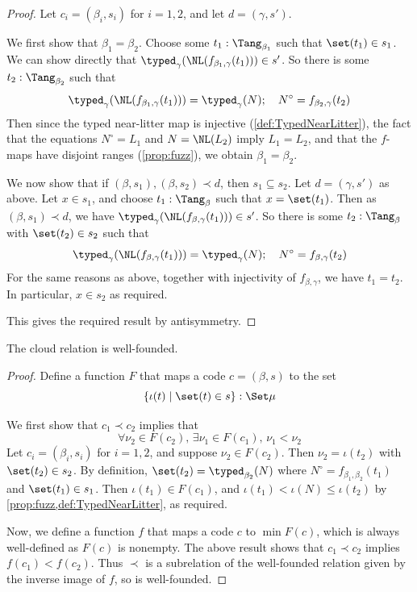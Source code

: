 \begin{proof}
  Let \( c_i = (\beta_i, s_i) \) for \( i = 1, 2 \), and let \( d = (\gamma, s') \).

  We first show that \( \beta_1 = \beta_2 \).
  Choose some \( t_1 : \Tang_{\beta_1} \) such that \( \set(t_1) \in s_1 \).
  We can show directly that \( \typed_\gamma(\NL(f_{\beta_1,\gamma}(t_1))) \in s' \).
  So there is some \( t_2 : \Tang_{\beta_2} \) such that
  \[ \typed_\gamma(\NL(f_{\beta_1,\gamma}(t_1))) = \typed_\gamma(N);\quad N^\circ = f_{\beta_2,\gamma}(t_2) \]
  Then since the typed near-litter map is injective (\cref{def:TypedNearLitter}), the fact that the equations \( N^\circ = L_1 \) and \( N = \NL(L_2) \) imply \( L_1 = L_2 \), and that the \( f \)-maps have disjoint ranges (\cref{prop:fuzz}), we obtain \( \beta_1 = \beta_2 \).

  We now show that if \( (\beta, s_1), (\beta, s_2) \prec d \), then \( s_1 \subseteq s_2 \).
  Let \( d = (\gamma, s') \) as above.
  Let \( x \in s_1 \), and choose \( t_1 : \Tang_\beta \) such that \( x = \set(t_1) \).
  Then as \( (\beta, s_1) \prec d \), we have \( \typed_\gamma(\NL(f_{\beta,\gamma}(t_1))) \in s' \).
  So there is some \( t_2 : \Tang_\beta \) with \( \set(t_2) \in s_2 \) such that
  \[ \typed_\gamma(\NL(f_{\beta,\gamma}(t_1))) = \typed_\gamma(N);\quad N^\circ = f_{\beta,\gamma}(t_2) \]
  For the same reasons as above, together with injectivity of \( f_{\beta,\gamma} \), we have \( t_1 = t_2 \).
  In particular, \( x \in s_2 \) as required.

  This gives the required result by antisymmetry.
\end{proof}
\begin{proposition}
  \label{prop:cloud_wf}
  The cloud relation is well-founded.
\end{proposition}
\begin{proof}
  Define a function \( F \) that maps a code \( c = (\beta, s) \) to the set
  \[ \{ \iota(t) \mid \set(t) \in s \} : \Set \mu \]

  We first show that \( c_1 \prec c_2 \) implies that
  \[ \forall \nu_2 \in F(c_2),\, \exists \nu_1 \in F(c_1),\, \nu_1 < \nu_2 \]
  Let \( c_i = (\beta_i, s_i) \) for \( i = 1, 2 \), and suppose \( \nu_2 \in F(c_2) \).
  Then \( \nu_2 = \iota(t_2) \) with \( \set(t_2) \in s_2 \).
  By definition, \( \set(t_2) = \typed_{\beta_2}(N) \) where \( N^\circ = f_{\beta_1,\beta_2}(t_1) \) and \( \set(t_1) \in s_1 \).
  Then \( \iota(t_1) \in F(c_1) \), and \( \iota(t_1) < \iota(N) \leq \iota(t_2) \) by \cref{prop:fuzz,def:TypedNearLitter}, as required.

  Now, we define a function \( f \) that maps a code \( c \) to \( \min F(c) \), which is always well-defined as \( F(c) \) is nonempty.
  The above result shows that \( c_1 \prec c_2 \) implies \( f(c_1) < f(c_2) \).
  Thus \( \prec \) is a subrelation of the well-founded relation given by the inverse image of \( f \), so is well-founded.
\end{proof}
